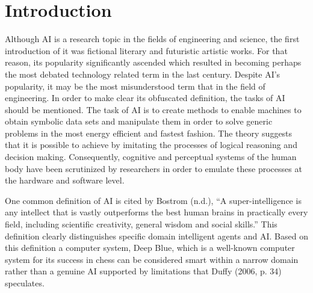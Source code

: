\documentclass[man]{apa6}
\begin{document}
\section{Introduction}
Although AI is a research topic in the fields of engineering and science, the first introduction of it was fictional literary and futuristic artistic works. For that reason, its popularity significantly
ascended which resulted in becoming perhaps the most debated technology related term in the last century. Despite AI's popularity, it may be the most misunderstood term that in the field of engineering. In order to make clear its obfuscated definition, the tasks of AI should be mentioned. The task of AI is to create methods to enable machines to obtain symbolic data sets and manipulate them in order to solve generic problems in the most energy efficient and fastest fashion. The theory suggests that it is possible to achieve by imitating the processes of logical reasoning and decision making. Consequently, cognitive and perceptual systems of the human body have been scrutinized by researchers in order to emulate these processes at the hardware and software level.\par
One common definition of AI is cited by Bostrom (n.d.), “A super-intelligence is any intellect that is vastly outperforms the best human brains in practically every field, including scientific creativity, general wisdom and social skills.” This definition clearly distinguishes specific domain intelligent agents and AI. Based on this definition a computer system, Deep Blue, which is a well-known computer system for its success in chess can be considered smart within a narrow domain rather than a genuine AI supported by limitations that Duffy (2006, p. 34) speculates. 
\end{document}
